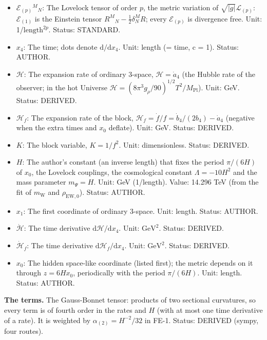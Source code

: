 \documentclass[
  10pt,
]{article}
\providecommand{\tightlist}{%
  \setlength{\itemsep}{0pt}\setlength{\parskip}{0pt}}
\begin{document}
\begin{itemize}
\tightlist
\item
  \(\mathcal{E}_{(p)}{}^M{}_N\): The Lovelock tensor of order \(p\), the
  metric variation of \(\sqrt{\lvert g\rvert}\mathcal{L}_{(p)}\):
  \(\mathcal{E}_{(1)}\) is the Einstein tensor
  \(R^M{}_N - \frac12\delta^M_NR\); every \(\mathcal{E}_{(p)}\) is
  divergence free. Unit: 1/\(\mathrm{length}^{2p}\). Status: STANDARD.
\item
  \(x_4\): The time; dots denote \(\mathrm{d}/\mathrm{d}x_4\). Unit:
  length (= time, c = 1). Status: AUTHOR.
\item
  \(\mathcal{H}\): The expansion rate of ordinary 3-space,
  \(\mathcal{H} = \dot a_4\) (the Hubble rate of the observer; in the
  hot Universe
  \(\mathcal{H} = (8\pi^3g_\rho/90)^{1/2}T^2/M_{\mathrm{Pl}}\)). Unit:
  GeV. Status: DERIVED.
\item
  \(\mathcal{H}_f\): The expansion rate of the block,
  \(\mathcal{H}_f = \dot f/f = \dot b_4/(2b_4) - \dot a_4\) (negative
  when the extra times and \(x_0\) deflate). Unit: GeV. Status: DERIVED.
\item
  \(K\): The block variable, \(K = 1/f^2\). Unit: dimensionless. Status:
  DERIVED.
\item
  \(H\): The author's constant (an inverse length) that fixes the period
  \(\pi/(6H)\) of \(x_0\), the Lovelock couplings, the cosmological
  constant \(\Lambda = -10H^2\) and the mass parameter \(m_\Psi = H\).
  Unit: GeV (1/length). Value: 14.296 TeV (from the fit of
  \(m_{\mathrm{W}}\) and \(\rho_{\mathrm{EW},0}\)). Status: AUTHOR.
\item
  \(x_1\): The first coordinate of ordinary 3-space. Unit: length.
  Status: AUTHOR.
\item
  \(\dot{\mathcal{H}}\): The time derivative
  \(\mathrm{d}\mathcal{H}/\mathrm{d}x_4\). Unit: \(\mathrm{GeV}^{2}\).
  Status: DERIVED.
\item
  \(\dot{\mathcal{H}}_f\): The time derivative
  \(\mathrm{d}\mathcal{H}_f/\mathrm{d}x_4\). Unit: \(\mathrm{GeV}^{2}\).
  Status: DERIVED.
\item
  \(x_0\): The hidden space-like coordinate (listed first); the metric
  depends on it through \(z = 6Hx_0\), periodically with the period
  \(\pi/(6H)\). Unit: length. Status: AUTHOR.
\end{itemize}

\textbf{The terms.} The Gauss-Bonnet tensor: products of two sectional
curvatures, so every term is of fourth order in the rates and \(H\)
(with at most one time derivative of a rate). It is weighted by
\(\alpha_{(2)} = H^{-2}/32\) in FE-1. Status: DERIVED (sympy, four
routes).
\end{document}
